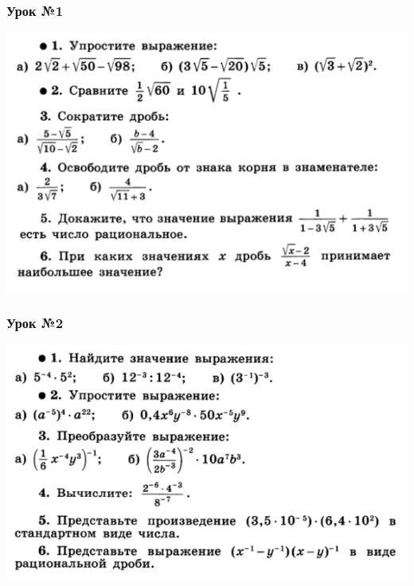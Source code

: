 \documentclass[algebra,a5paper]{pum}
\date{12.05.20}
\begin{document}
\subsubsection*{Урок №1}
\includegraphics[width=\textwidth]{img/22-1.png}

\subsubsection*{Урок №2}
\includegraphics[width=\textwidth]{img/22-2.png}
\end{document}
